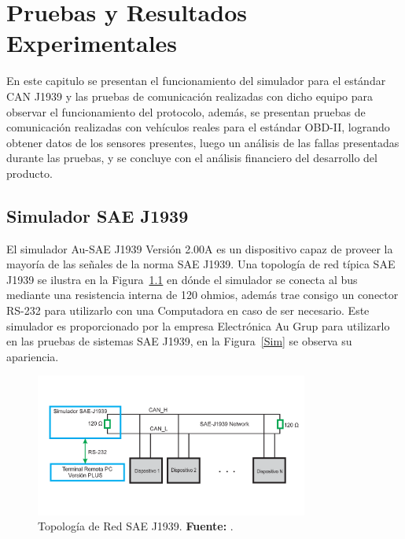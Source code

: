 \chapter[Pruebas y Resultados Experimentales]{Pruebas y Resultados Experimentales}

En este capitulo se presentan el funcionamiento del simulador para el estándar CAN J1939 y  las  pruebas de comunicación realizadas con dicho equipo para observar el funcionamiento del protocolo,  además, se presentan pruebas de comunicación realizadas con vehículos reales para el estándar OBD-II, logrando obtener datos de los sensores presentes, luego un análisis de las fallas presentadas durante las pruebas, y se concluye con el análisis financiero del desarrollo del producto.

\section{Simulador SAE J1939}

El simulador Au-SAE J1939 Versión 2.00A es un dispositivo capaz de proveer la mayoría de las señales de la norma SAE J1939. 
Una topología de red típica SAE J1939 se ilustra en la Figura~\ref{TPSAE} en dónde el simulador se conecta al bus mediante una resistencia interna de 120 ohmios, además trae consigo un conector RS-232 para utilizarlo con una Computadora en caso de ser necesario. 
Este simulador es proporcionado por la empresa Electrónica Au Grup para utilizarlo en las pruebas de sistemas SAE J1939, en la Figura~\ref{Sim} se observa su apariencia. 

\begin{figure}[H]
	\centering
		\includegraphics[width=0.8\textwidth]{./Cap6imagen/EjemploSimulador.pdf}
	\caption[Topología de Red SAE J1939.]{Topología de Red SAE J1939.\textbf{ Fuente:} \cite{UserM}.}
	\label{TPSAE} %
\end{figure}



